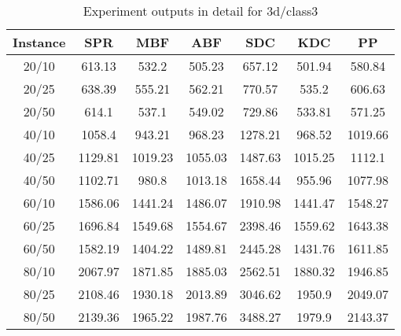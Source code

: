 \begin{table}[ht!]
    \caption{Experiment outputs in detail for 3d/class3}
    \centering
    \begin{tabular}{@{}ccccccc@{}}
        \toprule
        {\bfseries Instance} & {\bfseries SPR} & {\bfseries MBF}
        & {\bfseries ABF} & {\bfseries SDC} & {\bfseries KDC} & {\bfseries PP}\\
        \midrule
        20/10 & 613.13 & 532.2 & 505.23 & 657.12 & 501.94 & 580.84\\
        20/25 & 638.39 & 555.21 & 562.21 & 770.57 & 535.2 & 606.63\\
        20/50 & 614.1 & 537.1 & 549.02 & 729.86 & 533.81 & 571.25\\
        40/10 & 1058.4 & 943.21 & 968.23 & 1278.21 & 968.52 & 1019.66\\
        40/25 & 1129.81 & 1019.23 & 1055.03 & 1487.63 & 1015.25 & 1112.1\\
        40/50 & 1102.71 & 980.8 & 1013.18 & 1658.44 & 955.96 & 1077.98\\
        60/10 & 1586.06 & 1441.24 & 1486.07 & 1910.98 & 1441.47 & 1548.27\\
        60/25 & 1696.84 & 1549.68 & 1554.67 & 2398.46 & 1559.62 & 1643.38\\
        60/50 & 1582.19 & 1404.22 & 1489.81 & 2445.28 & 1431.76 & 1611.85\\
        80/10 & 2067.97 & 1871.85 & 1885.03 & 2562.51 & 1880.32 & 1946.85\\
        80/25 & 2108.46 & 1930.18 & 2013.89 & 3046.62 & 1950.9 & 2049.07\\
        80/50 & 2139.36 & 1965.22 & 1987.76 & 3488.27 & 1979.9 & 2143.37\\
        \bottomrule
    \end{tabular}
\end{table}